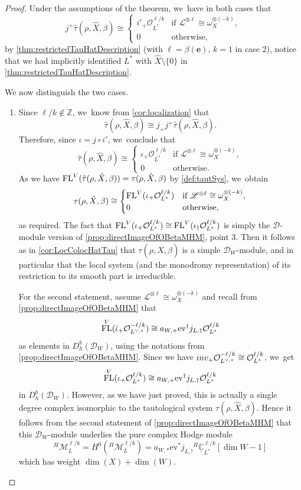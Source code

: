 \documentclass[11pt]{article}
\let\mathds\mathbb
\newcommand{\bme}{{\boldsymbol{e}}}
\newcommand{\ev}{\mathrm{ev}}
\newcommand{\dC}{{\mathds C}}\let\C\dC
\newcommand{\dZ}{{\mathds Z}}\let\mbz\dZ\let\Z\dZ
\newcommand{\cD}{\mathscr{D}}
\newcommand{\Ell}{\mathscr{L}}
\newcommand{\cM}{\mathcal{M}}
\newcommand{\cO}{\mathcal{O}}\let\O\cO
\DeclareMathOperator{\FL}{\textup{FL}}
\begin{document}
\begin{proof}
Under the assumptions of the theorem, we~have in both cases that
\[
j^+\hat\tau(\rho, \hat{X}, \beta) \cong
\begin{cases}
i'_+ \O_{L^*}^{\ell/k} &\text{if } \Ell^{\otimes \ell} \cong \omega_X^{\otimes (-k)}, \\
0 & \text{otherwise},
\end{cases}
\]
by \cref{thm:restrictedTauHatDescription} (with $\ell = \beta(\bme)$, $k = 1$ in case $2$), notice that we had implicitly identified $L^*$ with $\hat{X}\setminus \{0\}$ in \cref{thm:restrictedTauHatDescription}.

We now distinguish the two cases.
\begin{enumerate}
\item
Since
$\ell/k\notin \dZ$, we~know from
\cref{cor:localization}
that
\[
\hat{\tau}(\rho, \hat{X},\beta)\cong j_+j^+\hat{\tau}(\rho, \hat{X},\beta).
\]
Therefore, since $\iota=j\circ i'$, we~conclude that
\[
\hat{\tau}(\rho, \hat{X},\beta)\cong 
\begin{cases} \iota_+ \cO_{L^*}^{\ell/k} & \text{if } \Ell^{\otimes \ell} \cong \omega_X^{\otimes (-k)}, \\
0 &\text{otherwise}.
\end{cases}
\]
As we have $\FL^V(\hat\tau(\rho,\hat X, \beta)) = \tau(\rho,\hat X, \beta)$ by \cref{def:tautSys}, we~obtain
\[
\tau(\rho,\hat X, \beta) \cong 
\begin{cases}
\FL^V(\iota_+ \O_{L^*}^{\ell/k})
&\text{if } \Ell^{\otimes \ell} \cong \omega_X^{\otimes (-k)}, \\
0 &\text{otherwise},
\end{cases}
\]
as required. The fact that
$\FL^V(\iota_+ \O_{L^*}^{\ell/k}) \cong \FL^V(\iota_\dag \O_{L^*}^{\ell/k})$ is simply the $\cD$\nobreakdash-mod\-ule version of \cref{prop:directImageOfOBetaMHM}, point 3. Then it follows as in \cref{cor:LocColocHatTau} that $\tau(\rho,\hat{X},\beta)$ is a simple $\cD_W$\nobreakdash-mod\-ule, and in particular that the local system (and the monodromy representation) of its restriction to its smooth part is irreducible.

For the second statement, assume $\Ell^{\otimes \ell} \cong \omega_X^{\otimes (-k)}$ and recall from
\cref{prop:directImageOfOBetaMHM} that
\[
\FL^V(\hat\iota_+ \O_{L^{\vee,*}}^{-\ell/k}) \cong a_{W,+} \ev^\dag j_{L,\dag}\cO_{L^*}^{\ell/k}
\]
as elements in $D^b_h(\mathscr{D}_W)$, using the notations from \cref{prop:directImageOfOBetaMHM}. Since we have $\textup{inv}_+ \O_{L^{\vee,*}}^{-\ell/k} \cong \O_{L^*}^{\ell/k}$, we~get
\[
\FL^V(\iota_+ \O_{L^*}^{\ell/k}) \cong a_{W,+} \ev^\dag j_{L,\dag}\cO_{L^*}^{\ell/k}
\]
in $D^b_h(\mathscr D_W)$. However, as we have just proved, this is actually a single degree complex isomorphic to the tautological system $\tau(\rho,\hat X, \beta)$. Hence it follows from the second statement of \cref{prop:directImageOfOBetaMHM} that this $\mathscr{D}_W$\nobreakdash-mod\-ule underlies the pure complex Hodge module
\[
{^H\!\!}\cM_L^{\ell/k}=H^0({^H\!\!}\cM_L^{\ell/k}) =a_{W,*} \ev^* j_{L,!} {^H\!}\underline{\dC}_{L^*}^{\ell/k}[\dim W -1]
\]
which has weight $\dim(X)+\dim(W)$.


\end{enumerate}
\end{proof}
\end{document}
